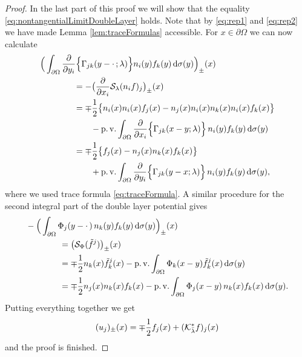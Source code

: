 \begin{proof}
  In the last part of this proof we will show that the equality \eqref{eq:nontangentialLimitDoubleLayer} holds.
  Note that by \eqref{eq:rep1} and \eqref{eq:rep2} we have made Lemma \ref{lem:traceFormulas} accessible.
  For $x \in \partial\Omega$ we can now calculate
  \begin{align*}
    &\Big( \int_{\partial\Omega} \frac{\partial}{\partial y_i} \Big\{ \Gamma_{jk}(y - \cdot\, ; \lambda) \Big\} n_i(y) f_k(y) \, {\operatorname{d}\!{\sigma}}(y) \Big)_\pm(x)\\
    &\qquad\qquad= - \big( \frac{\partial}{\partial x_i} \mathcal{S}_\lambda(n_i f)_j\big)_\pm(x) \\
    &\qquad\qquad= \mp \frac{1}{2} \big\{ n_i(x) n_i(x) f_j(x) - n_j(x) n_i(x) n_k(x) n_i(x) f_k(x)  \big\} \\
    &\qquad\qquad\qquad - \operatorname{p. v.}\int_{\partial\Omega} \frac{\partial}{\partial x_i} \Big\{\Gamma_{jk}(x - y; \lambda) \Big\} \, n_i(y) f_k(y) \, {\operatorname{d}\!{\sigma}}(y) \\
    &\qquad\qquad= \mp \frac{1}{2} \big\{ f_j(x) - n_j(x) n_k(x) f_k(x) \big\} \\
    &\qquad\qquad\qquad + \operatorname{p. v.}\int_{\partial\Omega} \frac{\partial}{\partial y_i} \Big\{\Gamma_{jk}(y - x; \lambda) \Big\}\,  n_i(y) f_k(y) \, {\operatorname{d}\!{\sigma}}(y),
  \end{align*}
  where we used trace formula \eqref{eq:traceFormula}.
  A similar procedure for the second integral part of the double layer potential gives
  \begin{align*}
    &-\Big(\int_{\partial\Omega} \Phi_j(y - \cdot\,) \, n_k(y) f_k(y) \, {\operatorname{d}\!{\sigma}}(y)\Big)_\pm(x) \\
    &\qquad\qquad= \big(\mathcal{S}_\Phi(\tilde f^j)\big)_\pm(x)  \\
    &\qquad\qquad= \mp \frac{1}{2} n_k(x) \tilde f^j_k(x) - \operatorname{p. v.} \int_{\partial\Omega} \Phi_k(x - y) \tilde f^j_k(x) \, {\operatorname{d}\!{\sigma}}(y) \\
    &\qquad\qquad= \mp \frac{1}{2} n_j(x) n_k(x) f_k(x) - \operatorname{p. v.} \int_{\partial\Omega} \Phi_j(x - y)\, n_k(x) f_k(x) \, {\operatorname{d}\!{\sigma}}(y).
  \end{align*}
  Putting everything together we get
  \begin{align*}
    (u_j)_\pm(x) = \mp\frac{1}{2} f_j(x) + (\mathcal{K}_{\bar\lambda}^* f)_j(x)
  \end{align*}
  and the proof is finished.
\end{proof}
